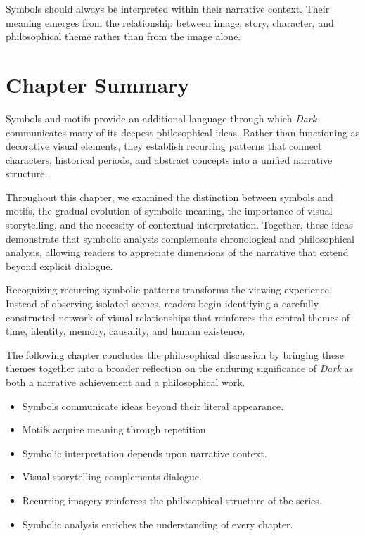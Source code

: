 \documentclass[12pt,oneside,openany]{book}
\begin{document}
\begin{tcolorbox}[colback=yellow!8,colframe=orange!70!black,title=Interpretive Principle]
Symbols should always be interpreted within their narrative context. Their
meaning emerges from the relationship between image, story, character, and
philosophical theme rather than from the image alone.
\end{tcolorbox}

\section{Chapter Summary}

Symbols and motifs provide an additional language through which \textit{Dark}
communicates many of its deepest philosophical ideas. Rather than functioning
as decorative visual elements, they establish recurring patterns that connect
characters, historical periods, and abstract concepts into a unified narrative
structure.

Throughout this chapter, we examined the distinction between symbols and
motifs, the gradual evolution of symbolic meaning, the importance of visual
storytelling, and the necessity of contextual interpretation. Together, these
ideas demonstrate that symbolic analysis complements chronological and
philosophical analysis, allowing readers to appreciate dimensions of the
narrative that extend beyond explicit dialogue.

Recognizing recurring symbolic patterns transforms the viewing experience.
Instead of observing isolated scenes, readers begin identifying a carefully
constructed network of visual relationships that reinforces the central themes
of time, identity, memory, causality, and human existence.

The following chapter concludes the philosophical discussion by bringing these
themes together into a broader reflection on the enduring significance of
\textit{Dark} as both a narrative achievement and a philosophical work.

\begin{tcolorbox}[colback=orange!8,colframe=orange!70!black,title=Chapter Takeaways]
\begin{itemize}
\item Symbols communicate ideas beyond their literal appearance.
\item Motifs acquire meaning through repetition.
\item Symbolic interpretation depends upon narrative context.
\item Visual storytelling complements dialogue.
\item Recurring imagery reinforces the philosophical structure of the series.
\item Symbolic analysis enriches the understanding of every chapter.
\end{itemize}
\end{tcolorbox}
\end{document}
